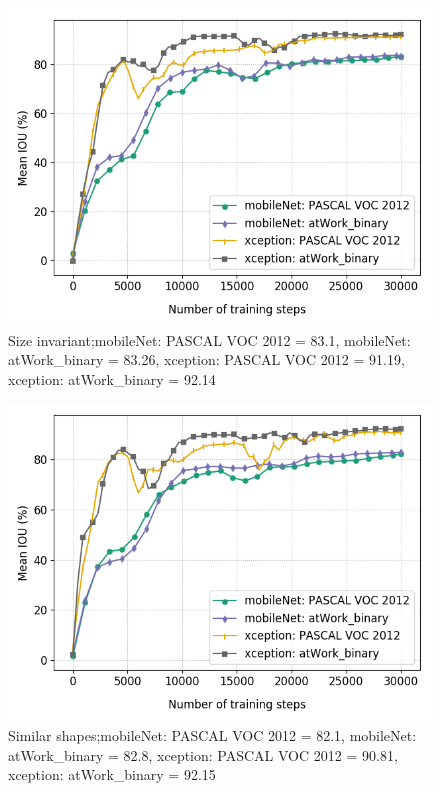 \begin{figure}
	\includegraphics[scale=0.4]{images/transfer_size}
	\caption{Size invariant;mobileNet: PASCAL VOC 2012 = 83.1, mobileNet: atWork\_binary = 83.26, xception: PASCAL VOC 2012 = 91.19, xception: atWork\_binary = 92.14}
\end{figure}

\begin{figure}
	\includegraphics[scale=0.4]{images/transfer_shape}
	\caption{Similar shapes;mobileNet: PASCAL VOC 2012 = 82.1, mobileNet: atWork\_binary = 82.8, xception: PASCAL VOC 2012 = 90.81, xception: atWork\_binary = 92.15}
\end{figure}

